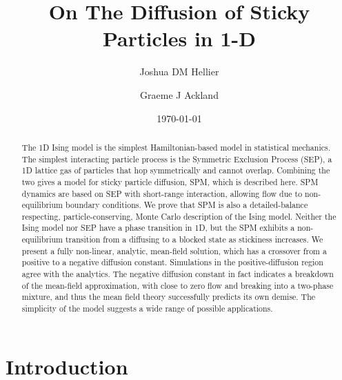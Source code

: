 \documentclass[
reprint, amsmath,amssymb, aps,
]{revtex4-1}
\begin{document}
\title{On The Diffusion of Sticky Particles in 1-D}

\author{Joshua DM Hellier}
\author{Graeme J Ackland}

\date{\today}%

\begin{abstract}
The 1D Ising model is the simplest Hamiltonian-based model in statistical
mechanics. The simplest interacting particle process is the Symmetric
Exclusion Process (SEP), a  1D lattice gas of particles that hop
symmetrically and cannot overlap.  Combining the two gives a model for
sticky particle diffusion, SPM, which is described here.  SPM dynamics
are based on SEP with short-range interaction, allowing flow due to
non-equilibrium boundary conditions.  We prove that SPM is also a
detailed-balance respecting, particle-conserving,  Monte Carlo description of the Ising
model.  Neither the Ising model nor SEP have a phase transition in 1D, but the SPM exhibits a non-equilibrium transition from a
diffusing to a blocked state as stickiness increases.  We present a
fully non-linear, analytic, mean-field solution, which has a crossover
from a positive to a negative diffusion constant.  Simulations in the
positive-diffusion region agree with the analytics. The negative
diffusion constant in fact indicates a breakdown of the mean-field
approximation, with close to zero flow and breaking into a two-phase
mixture, and thus the mean field theory successfully predicts its own
demise.  The simplicity of the model suggests a wide range of
possible applications.


\end{abstract}

\maketitle


\section{Introduction}
\end{document}
